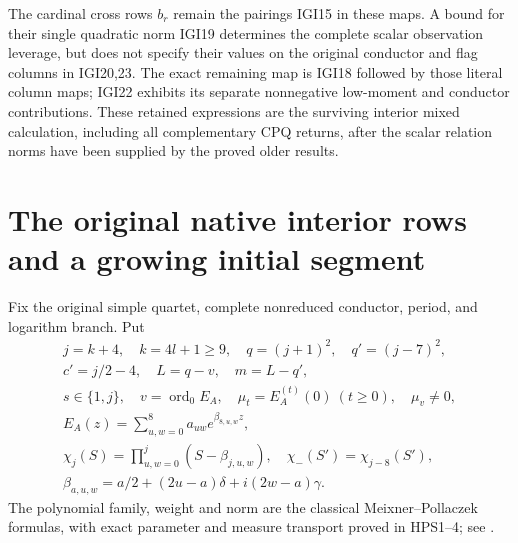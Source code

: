 \documentclass[11pt,a4paper]{article}
\begin{document}
The cardinal cross rows $b_r$ remain the pairings IGI15 in these
maps. A bound for their single quadratic norm IGI19 determines
the complete scalar observation leverage, but does not specify
their values on the original conductor and flag columns in
IGI20,23. The exact remaining map is IGI18 followed by those
literal column maps; IGI22 exhibits its separate nonnegative
low-moment and conductor contributions. These retained expressions
are the surviving interior mixed calculation, including all
complementary CPQ returns, after the scalar relation norms have
been supplied by the proved older results.
\endgroup

\label{MTBUILD:ORIGINAL_GRID_INTERIOR_INTERFACE_COMPLETE_PREREQUISITE:end}

\clearpage
\label{MTBUILD:ORIGINAL_NATIVE_INTERIOR_BOUND_COMPLETE_PREREQUISITE:start}
\begingroup
\section{The original native interior rows and a growing initial segment}
\label{sec:NIB}

Fix the original simple quartet, complete nonreduced conductor, period,
and logarithm branch. Put
\[
\begin{gathered}
 j=k+4,\quad k=4l+1\ge9,\quad q=(j+1)^2,\quad q'=(j-7)^2,\\
 c'=j/2-4,\quad L=q-v,\quad m=L-q',\\
 s\in\{1,j\},\quad v=\operatorname{ord}_0E_A,\quad
 \mu_t=E_A^{(t)}(0)\ (t\ge0),\quad\mu_v\ne0,\\
 E_A(z)=\sum_{u,w=0}^8a_{uw}e^{\beta_{8,u,w}z},\\
 \chi_j(S)=\prod_{u,w=0}^j(S-\beta_{j,u,w}),\quad
 \chi_-(S')=\chi_{j-8}(S'),\\
 \beta_{a,u,w}=a/2+(2u-a)\delta+i(2w-a)\gamma.
\end{gathered}                                                     \tag{NIB1}
\]
The polynomial family, weight and norm are the classical Meixner--Pollaczek formulas, with exact parameter and measure transport proved in HPS1--4; see \cite[eqs.~(18.19.8)--(18.19.9), (18.22.8)]{human:dlmf18}.
\end{document}
